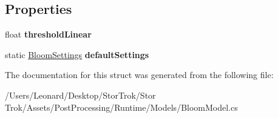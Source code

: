 \subsection*{Properties}
\begin{DoxyCompactItemize}
\item 
\mbox{\label{struct_unity_engine_1_1_post_processing_1_1_bloom_model_1_1_bloom_settings_a7f6ebd042c6cad8cad0eb684f4b0a148}} 
float {\bfseries threshold\+Linear}
\item 
\mbox{\label{struct_unity_engine_1_1_post_processing_1_1_bloom_model_1_1_bloom_settings_addcdcbd0f26e700c1857b06be41e462b}} 
static \hyperlink{struct_unity_engine_1_1_post_processing_1_1_bloom_model_1_1_bloom_settings}{Bloom\+Settings} {\bfseries default\+Settings}
\end{DoxyCompactItemize}


The documentation for this struct was generated from the following file\+:\begin{DoxyCompactItemize}
\item 
/\+Users/\+Leonard/\+Desktop/\+Stor\+Trok/\+Stor Trok/\+Assets/\+Post\+Processing/\+Runtime/\+Models/Bloom\+Model.\+cs\end{DoxyCompactItemize}
